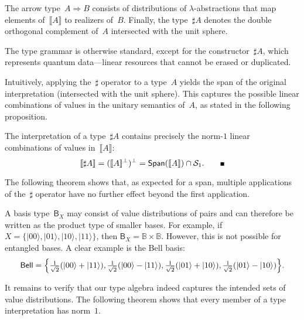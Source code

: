 \documentclass[runningheads,orivec,envcountsame,envcountsect]{llncs}
\providecommand{\qed}{\hbox{\rule{1ex}{1ex}}}%
\newcommand\ket[1]{\ensuremath{|#1\rangle}}
\newcommand\Span[1]{\ensuremath{{\mathsf{Span}}{#1}}}
\def\Sph{\mathcal{S}_1}       %
\def\Arr{\Rightarrow}
\def\sem#1{\llbracket#1\rrbracket}
\newcommand\B{\mathbb B}
\newcommand\basis[1]{\ensuremath{\mathsf{B}_{#1}}}
\begin{document}
The arrow type~$A\Arr B$ consists of distributions of $\lambda$-abstractions
that map elements of~$\sem{A}$ to realizers of~$B$.  
Finally, the type~$\sharp A$ denotes the double orthogonal complement of~$A$
intersected with the unit sphere.

The type grammar is otherwise standard, except for the constructor~$\sharp A$,
which represents quantum data---linear resources that cannot be erased or
duplicated.  

Intuitively, applying the~$\sharp$ operator to a type~$A$ yields the span of the
original interpretation (intersected with the unit sphere).  This captures the
possible linear combinations of values in the unitary semantics of~$A$, as
stated in the following proposition.

\begin{theorem}\label{thm:SharpCharacterization}
  The interpretation of a type~$\sharp A$ contains precisely the
  norm-$1$ linear combinations of values in~$\sem{A}$:
  \[
    \sem{\sharp A}
    = (\sem{A}^\bot)^\bot
    = \Span(\sem{A}) \cap \Sph.
    \tag*{\qed}
  \]
\end{theorem}



The following theorem shows that, as expected for a span, multiple
applications of the~$\sharp$ operator have no further effect beyond the first
application.


\begin{remark}
  A basis type~$\basis{X}$ may consist of value distributions of pairs and can
  therefore be written as the product type of smaller bases. For example, if
  $X=\{\ket{00},\ket{01},\ket{10},\ket{11}\}$, then $\basis{X}=\B\times\B$.
  However, this is not possible for entangled bases. A clear example is the
  Bell basis:
  \[
    \mathsf{Bell}
    =\Bigl\{
      \tfrac{1}{\sqrt{2}}(\ket{00}+\ket{11}),
      \tfrac{1}{\sqrt{2}}(\ket{00}-\ket{11}),
      \tfrac{1}{\sqrt{2}}(\ket{01}+\ket{10}),
      \tfrac{1}{\sqrt{2}}(\ket{01}-\ket{10})
    \Bigr\}.
  \]
\end{remark}

It remains to verify that our type algebra indeed captures the intended sets of
value distributions. The following theorem shows that every member of a type
interpretation has norm~$1$.
\end{document}
